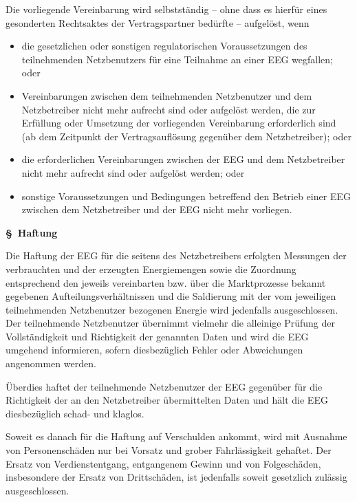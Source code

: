 \documentclass[a4paper,11pt]{article}
\newcounter{parasec}
\newcommand{\parasec}[1]{%
  \stepcounter{parasec}%
  \par\Needspace*{5\baselineskip}%
  \bigskip
  {\large\bfseries\color{tuerkis}\S\ \theparasec\quad #1}\par\nopagebreak
  \smallskip\nopagebreak
}
\begin{document}
Die vorliegende Vereinbarung wird selbstständig -- ohne dass es hierfür eines gesonderten Rechtsaktes der Vertragspartner bedürfte -- aufgelöst, wenn

\begin{itemize}
  \item die gesetzlichen oder sonstigen regulatorischen Voraussetzungen des teilnehmenden Netzbenutzers für eine Teilnahme an einer EEG wegfallen; oder
  \item Vereinbarungen zwischen dem teilnehmenden Netzbenutzer und dem Netzbetreiber nicht mehr aufrecht sind oder aufgelöst werden, die zur Erfüllung oder Umsetzung der vorliegenden Vereinbarung erforderlich sind (ab dem Zeitpunkt der Vertragsauflösung gegenüber dem Netzbetreiber); oder
  \item die erforderlichen Vereinbarungen zwischen der EEG und dem Netzbetreiber nicht mehr aufrecht sind oder aufgelöst werden; oder
  \item sonstige Voraussetzungen und Bedingungen betreffend den Betrieb einer EEG zwischen dem Netzbetreiber und der EEG nicht mehr vorliegen.
\end{itemize}

\parasec{Haftung}

Die Haftung der EEG für die seitens des Netzbetreibers erfolgten Messungen der verbrauchten und der erzeugten Energiemengen sowie die Zuordnung entsprechend den jeweils vereinbarten bzw. über die Marktprozesse bekannt gegebenen Aufteilungsverhältnissen und die Saldierung mit der vom jeweiligen teilnehmenden Netzbenutzer bezogenen Energie wird jedenfalls ausgeschlossen. Der teilnehmende Netzbenutzer übernimmt vielmehr die alleinige Prüfung der Vollständigkeit und Richtigkeit der genannten Daten und wird die EEG umgehend informieren, sofern diesbezüglich Fehler oder Abweichungen angenommen werden.

Überdies haftet der teilnehmende Netzbenutzer der EEG gegenüber für die Richtigkeit der an den Netzbetreiber übermittelten Daten und hält die EEG diesbezüglich schad- und klaglos.

Soweit es danach für die Haftung auf Verschulden ankommt, wird mit Ausnahme von Personenschäden nur bei Vorsatz und grober Fahrlässigkeit gehaftet. Der Ersatz von Verdienstentgang, entgangenem Gewinn und von Folgeschäden, insbesondere der Ersatz von Drittschäden, ist jedenfalls soweit gesetzlich zulässig ausgeschlossen.
\end{document}
